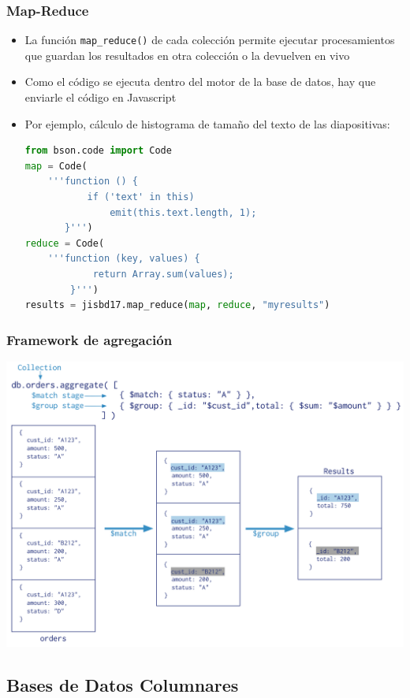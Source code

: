 \documentclass[14pt]{beamer}
\begin{document}
\begin{frame}
  \frametitle{Map-Reduce}
  \begin{itemize}
  \item La función {\tt map\_reduce()} de cada colección permite ejecutar
    procesamientos que guardan los resultados en otra colección o la
    devuelven en vivo
  \item Como el código se ejecuta dentro del motor de la base de datos, hay
    que enviarle el código en Javascript
  \item Por ejemplo, cálculo de histograma de tamaño del texto de las
    diapositivas:
\framebreak
\begin{lstlisting}[language=Python]
from bson.code import Code
map = Code(
    '''function () {
           if ('text' in this)
               emit(this.text.length, 1);
       }''')
reduce = Code(
    '''function (key, values) {
            return Array.sum(values);
        }''')
results = jisbd17.map_reduce(map, reduce, "myresults")
\end{lstlisting}

  \end{itemize}
\end{frame}


\begin{frame}
  \frametitle{Framework de agregación}
  \centering\includegraphics[height=.85\textheight]{img/mongo-aggregation}
\end{frame}


\subsection{Bases de Datos Columnares}
\end{document}
